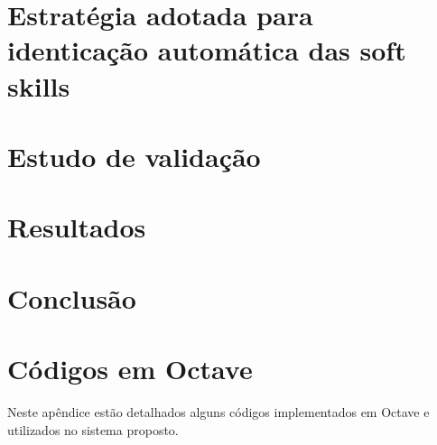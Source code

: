 \documentclass{ppgi}
\begin{document}
\listailustracoes

\listatabelas

\sumario

\elementostextuais







\chapter{Estratégia adotada para identicação automática das soft skills}
\chapter{Estudo de validação}
\chapter{Resultados}
\chapter{Conclusão}

\postextual



\apendices

\chapter{Códigos em Octave}
\label{apendice}

Neste apêndice estão detalhados alguns códigos implementados em Octave e utilizados no sistema proposto.
\end{document}
